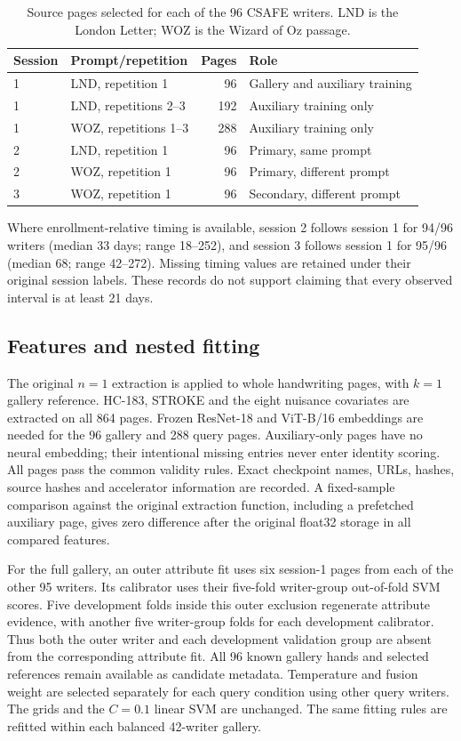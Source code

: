 \documentclass[10pt,a4paper]{article}
\begin{document}
\begin{table}[ht]
\caption{Source pages selected for each of the 96 CSAFE writers. LND is the London Letter; WOZ is the Wizard of Oz passage.}\label{tab:csafepages}
\centering\small
\begin{tabular}{llrl}\toprule
Session & Prompt/repetition & Pages & Role\\\midrule
1 & LND, repetition 1 & 96 & Gallery and auxiliary training\\
1 & LND, repetitions 2--3 & 192 & Auxiliary training only\\
1 & WOZ, repetitions 1--3 & 288 & Auxiliary training only\\
2 & LND, repetition 1 & 96 & Primary, same prompt\\
2 & WOZ, repetition 1 & 96 & Primary, different prompt\\
3 & WOZ, repetition 1 & 96 & Secondary, different prompt\\\bottomrule
\end{tabular}
\end{table}

Where enrollment-relative timing is available, session 2 follows session 1 for 94/96 writers (median 33 days; range 18--252), and session 3 follows session 1 for 95/96 (median 68; range 42--272). Missing timing values are retained under their original session labels. These records do not support claiming that every observed interval is at least 21 days.

\subsection{Features and nested fitting}
The original $n=1$ extraction is applied to whole handwriting pages, with $k=1$ gallery reference. HC-183, STROKE and the eight nuisance covariates are extracted on all 864 pages. Frozen ResNet-18 and ViT-B/16 embeddings are needed for the 96 gallery and 288 query pages. Auxiliary-only pages have no neural embedding; their intentional missing entries never enter identity scoring. All pages pass the common validity rules. Exact checkpoint names, URLs, hashes, source hashes and accelerator information are recorded. A fixed-sample comparison against the original extraction function, including a prefetched auxiliary page, gives zero difference after the original float32 storage in all compared features.

For the full gallery, an outer attribute fit uses six session-1 pages from each of the other 95 writers. Its calibrator uses their five-fold writer-group out-of-fold SVM scores. Five development folds inside this outer exclusion regenerate attribute evidence, with another five writer-group folds for each development calibrator. Thus both the outer writer and each development validation group are absent from the corresponding attribute fit. All 96 known gallery hands and selected references remain available as candidate metadata. Temperature and fusion weight are selected separately for each query condition using other query writers. The grids and the $C=0.1$ linear SVM are unchanged. The same fitting rules are refitted within each balanced 42-writer gallery.
\end{document}
